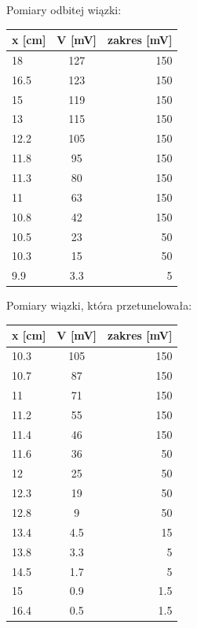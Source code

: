 \documentclass[a4paper,12pt]{article}
\begin{document}
Pomiary odbitej wiązki:

\begin{tabular}{ l | c | r }
  		x [cm] & V [mV] & zakres [mV] \\
  		\hline
		18&127&150 \\
		16.5&123&150 \\
		15&119&150 \\
		13&115&150 \\
		12.2&105&150 \\
		11.8&95&150 \\
		11.3&80&150 \\
		11&63&150 \\
		10.8&42&150 \\
		10.5&23&50 \\
		10.3&15&50 \\
		9.9&3.3&5 \\


\end{tabular}

Pomiary wiązki, która przetunelowała:

\begin{tabular}{ l | c | r }

	x [cm] & V [mV] & zakres [mV] \\
	\hline
	10.3&105&150 \\
	10.7&87&150 \\
	11&71&150 \\
	11.2&55&150 \\
	11.4&46&150 \\
	11.6&36&50 \\
	12&25&50 \\
	12.3&19&50 \\
	12.8&9&50 \\
	13.4&4.5&15 \\
	13.8&3.3&5 \\
	14.5&1.7&5 \\
	15&0.9&1.5 \\
	16.4&0.5&1.5 \\

\end{tabular}
\end{document}

